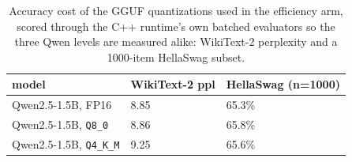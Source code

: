 \documentclass[11pt]{article}
\begin{document}
\begin{table}[htbp]\centering
\caption{Accuracy cost of the GGUF quantizations used in the efficiency arm, scored through the C++ runtime's own batched evaluators so the three Qwen levels are measured alike: WikiText-2 perplexity and a 1000-item HellaSwag subset.}
\label{tab:quant-cost}
\footnotesize
\begin{tabular}{lll}\toprule
model & WikiText-2 ppl & HellaSwag (n=1000) \\
\midrule
Qwen2.5-1.5B, FP16 & 8.85 & 65.3\% \\
Qwen2.5-1.5B, \texttt{Q8\_0} & 8.86 & 65.8\% \\
Qwen2.5-1.5B, \texttt{Q4\_K\_M} & 9.25 & 65.6\% \\
\bottomrule\end{tabular}\end{table}
\end{document}
